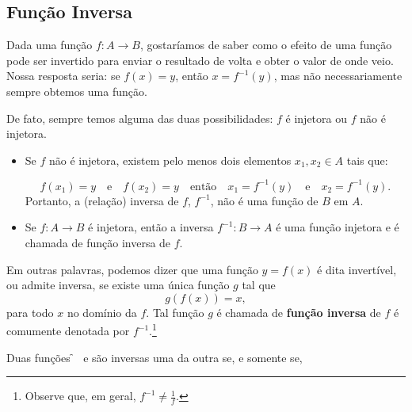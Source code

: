 \documentclass[../main.tex]{subfiles}
\begin{document}
\subsection{Função Inversa}\label{subsec:FuncInversa}
Dada uma função \(f: A\rightarrow B\), gostaríamos de saber como o efeito de uma função pode ser invertido para enviar o resultado de volta e obter o valor de onde veio. Nossa resposta seria: se \(f(x)=y\), então \(x=f^{-1}(y)\), mas não necessariamente sempre obtemos uma função.

De fato, sempre temos alguma das duas possibilidades: \(f\) é injetora ou \(f\) não é injetora.
\begin{itemize}
    \item Se \(f\) não é injetora, existem pelo menos dois elementos \(x_1,x_2\in A\) tais que:

\[f(x_1)=y \quad \mbox{e} \quad f(x_2)=y\quad \mbox{então}\quad x_1=f^{-1}(y) \quad \mbox{e} \quad x_2=f^{-1}(y). \]
Portanto, a (relação) inversa de \(f\), \(f^{-1}\), não é uma função de \(B\) em \(A\).

\item Se \(f: A\rightarrow B\) é injetora, então a inversa \( f^{-1}: B\rightarrow A\) é uma função injetora e é chamada de função inversa de \(f\).
\end{itemize}

Em outras palavras, podemos dizer que uma função $y=f(x)$ é dita invertível, ou admite inversa, se existe uma única função $g$ tal que
\begin{equation*}
  g(f(x)) = x,
\end{equation*}
para todo $x$ no domínio da $f$. Tal função $g$ é chamada de {\bf função inversa} de $f$ é comumente denotada por $f^{-1}$.\footnote{Observe que, em geral, $f^{-1} \neq \frac{1}{f}$.}
\begin{framed}
\begin{prop}\label{prop:CompFuncInv}
Duas funções \f~\! e \g são inversas uma da outra se, e somente se, 
\end{prop}\end{framed}
\end{document}
